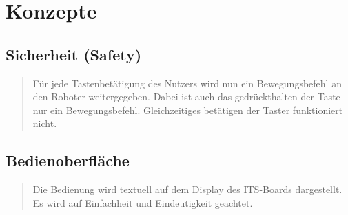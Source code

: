 \chapter{Konzepte}
\begin{quote}
	
\end{quote}

	
	
	

\section{Sicherheit (Safety)}
\begin{quote}
Für jede Tastenbetätigung des Nutzers wird nun ein Bewegungsbefehl an den Roboter weitergegeben.
Dabei ist auch das gedrückthalten der Taste nur ein Bewegungsbefehl. Gleichzeitiges betätigen der Taster funktioniert nicht. 
\end{quote}
\section{Bedienoberfläche}
\begin{quote}
	Die Bedienung wird textuell auf dem Display des ITS-Boards dargestellt. Es wird auf Einfachheit und Eindeutigkeit geachtet.
	
\end{quote}

